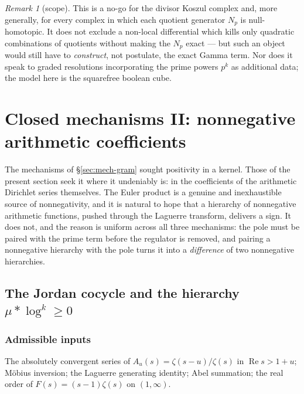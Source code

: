 \documentclass[11pt]{amsart}
\theoremstyle{definition}
\theoremstyle{remark}
\newtheorem{remark}[theorem]{Remark}
\theoremstyle{definition}
\renewcommand{\Re}{\operatorname{Re}}
\begin{document}
\begin{remark}[scope]\label{rmk:koszul-scope}
This is a no-go for the divisor Koszul complex and, more generally, for every complex in which
each quotient generator $N_p$ is null-homotopic. It does not exclude a non-local differential
which kills only quadratic combinations of quotients without making the $N_p$ exact --- but such
an object would still have to \emph{construct}, not postulate, the exact Gamma term. Nor does it
speak to graded resolutions incorporating the prime powers $p^k$ as additional data; the model
here is the squarefree boolean cube.
\end{remark}

\section{Closed mechanisms II: nonnegative arithmetic coefficients}\label{sec:mech-coeff}

The mechanisms of \S\ref{sec:mech-gram} sought positivity in a kernel. Those of the present
section seek it where it undeniably is: in the coefficients of the arithmetic Dirichlet series
themselves. The Euler product is a genuine and inexhaustible source of nonnegativity, and it is
natural to hope that a hierarchy of nonnegative arithmetic functions, pushed through the Laguerre
transform, delivers a sign. It does not, and the reason is uniform across all three mechanisms:
the pole must be paired with the prime term before the regulator is removed, and pairing a
nonnegative hierarchy with the pole turns it into a \emph{difference} of two nonnegative
hierarchies.

\subsection{The Jordan cocycle and the hierarchy $\mu*\log^k\ge0$}\label{sec:jordan}

\subsubsection*{Admissible inputs}
The absolutely convergent series of $A_u(s)=\zeta(s-u)/\zeta(s)$ in $\Re s>1+u$; M\"obius
inversion; the Laguerre generating identity; Abel summation; the real order of
$F(s)=(s-1)\zeta(s)$ on $(1,\infty)$.
\end{document}
